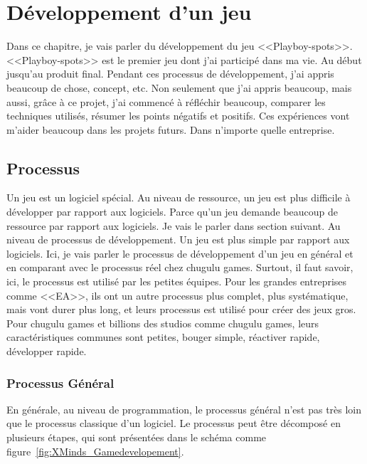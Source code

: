 \chapter{Développement d'un jeu} %
\label{cha:développement_d_un_jeu}

Dans ce chapitre, je vais parler du développement du jeu <<Playboy-spots>>. <<Playboy-spots>> est le premier jeu dont j'ai participé dans ma vie. Au début jusqu'au produit final. Pendant ces processus de développement, j'ai appris beaucoup de chose, concept, etc. Non seulement que j'ai appris beaucoup, mais aussi, grâce à ce projet, j'ai commencé à réfléchir beaucoup, comparer les techniques utilisés, résumer les points négatifs et positifs. Ces expériences vont m'aider beaucoup dans les projets futurs. Dans n'importe quelle entreprise.

\section{Processus} %
\label{sec:processus}

Un jeu est un logiciel spécial. Au niveau de ressource, un jeu est plus difficile à développer par rapport aux logiciels. Parce qu’un jeu demande beaucoup de ressource par rapport aux logiciels. Je vais le parler dans section suivant. Au niveau de processus de développement. Un jeu est plus simple par rapport aux logiciels. Ici, je vais parler le processus de développement d'un jeu en général et en comparant avec le processus réel chez chugulu games. Surtout, il faut savoir, ici, le processus est utilisé par les petites équipes. Pour les grandes entreprises comme <<EA>>, ils ont un autre processus plus complet, plus systématique, mais vont durer plus long, et leurs processus est utilisé pour créer des jeux gros. Pour chugulu games et billions des studios comme chugulu games, leurs caractéristiques communes sont petites, bouger simple, réactiver rapide, développer rapide. 


\subsection{Processus Général} %
\label{sub:processus_général}

En générale, au niveau de programmation, le processus général n'est pas très loin que le processus classique d'un logiciel. Le processus peut être décomposé en plusieurs étapes, qui sont présentées dans le schéma comme figure~\ref{fig:XMinds_Gamedevelopement}.

